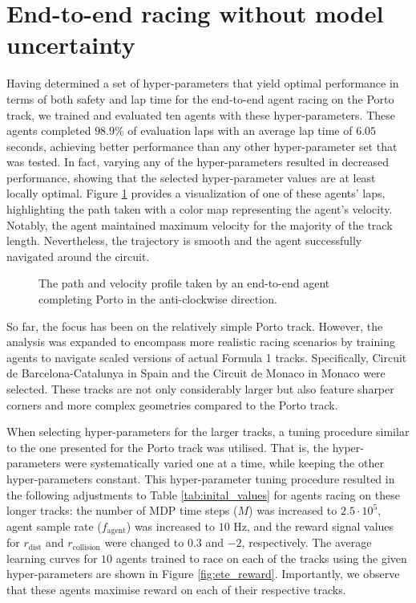 
\section{End-to-end racing without model uncertainty}

Having determined a set of hyper-parameters that yield optimal performance in terms of both safety and lap time for the end-to-end agent racing on the Porto track, 
we trained and evaluated ten agents with these hyper-parameters.
These agents completed $98.9\%$ of evaluation laps with an average lap time of $6.05$ seconds, achieving better performance than any other hyper-parameter set that was tested.
In fact, varying any of the hyper-parameters resulted in decreased performance, showing that the selected hyper-parameter values are at least locally optimal.
Figure \ref{fig:ete_porto} provides a visualization of one of these agents' laps, highlighting the path taken with a color map representing the agent's velocity. 
Notably, the agent maintained maximum velocity for the majority of the track length.
Nevertheless, the trajectory is smooth and the agent successfully navigated around the circuit.

\begin{figure}[htb!]
    \centering
    
    \caption[The path and velocity profile taken by an end-to-end agent completing Porto]{The path and velocity profile taken by an end-to-end agent completing Porto in the anti-clockwise direction.}
    \label{fig:ete_porto}
\end{figure}


So far, the focus has been on the relatively simple Porto track. 
However, the analysis was expanded to encompass more realistic racing scenarios by training agents to navigate scaled versions of actual Formula 1 tracks. 
Specifically, Circuit de Barcelona-Catalunya in Spain and the Circuit de Monaco in Monaco were selected. 
These tracks are not only considerably larger but also feature sharper corners and more complex geometries compared to the Porto track.


When selecting hyper-parameters for the larger tracks, a tuning procedure similar to the one presented for the Porto track was utilised. 
That is, the hyper-parameters were systematically varied one at a time, while keeping the other hyper-parameters constant. 
This hyper-parameter tuning procedure resulted in the following adjustments to Table \ref{tab:inital_values} for agents racing on these longer tracks: the number of MDP time steps ($M$) was increased to $2.5\cdot10^{5}$, agent sample rate ($f_{\text{agent}}$) was increased to $10$ Hz, and the reward signal values for $r_{\text{dist}}$ and  $r_{\text{collision}}$ were changed to $0.3$ and $-2$, respectively.
The average learning curves for $10$ agents trained to race on each of the tracks using the given hyper-parameters are shown in Figure \ref{fig:ete_reward}.
Importantly, we observe that these agents maximise reward on each of their respective tracks.

